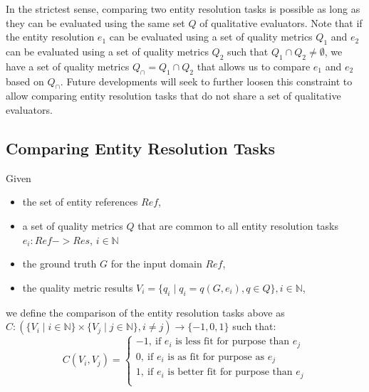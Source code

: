 \documentclass[11pt]{article}
\begin{document}
    In the strictest sense, comparing two entity resolution tasks is possible as
    long as they can be evaluated using the same set $Q$ of qualitative
    evaluators.
    Note that if the entity resolution $e_1$ can be evaluated using a set of
    quality metrics $Q_1$ and $e_2$ can be evaluated using a set of quality
    metrics $Q_2$ such that $Q_1 \cap Q_2 \neq \emptyset$, we have a set of
    quality metrics $Q_\cap = Q_1 \cap Q_2$ that allows us to compare $e_1$ and
    $e_2$ based on $Q_\cap$.
    Future developments will seek to further loosen this constraint to allow
    comparing entity resolution tasks that do not share a set of qualitative
    evaluators.

    \subsection[cert]{Comparing Entity Resolution Tasks}\label{subsec:cert}

    \begin{defn}
        Given
        \begin{itemize}
            \item the set of entity references $Ref$,
            \item a set of quality metrics $Q$ that are common to all
            entity resolution tasks $e_i : Ref -> Res$, $i \in \mathbb{N}$
            \item the ground truth $G$ for the input domain $Ref$,
            \item the quality metric results
            $V_i=\{q_{i} \mid q_{i} = q(G, e_i), q \in Q\}, i \in \mathbb{N}$,
        \end{itemize}   
        we define the comparison of the entity resolution tasks above as
        $C : (
            \{V_i \mid i \in \mathbb{N}\}
            \times
            \{V_j \mid j \in \mathbb{N}\},
            i \neq j
        ) \rightarrow \{-1, 0, 1\}$ such that:
        \[ 
C(V_i, V_j) = \left\{
\begin{array}{ll}
      -1,~\textrm{if $e_i$ is less fit for purpose than $e_j$}\\
      0,~\textrm{if $e_i$ is as fit for purpose as $e_j$}\\
      1,~\textrm{if $e_i$ is better fit for purpose than $e_j$}\\
\end{array} 
\right. 
\]

    \end{defn}
\end{document}
